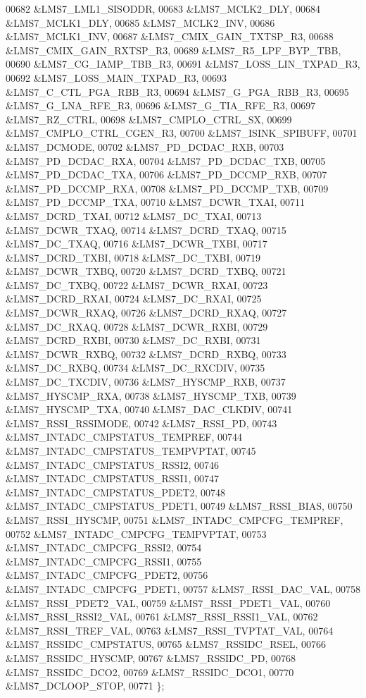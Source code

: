 \begin{DoxyCode}
00682 &LMS7_LML1_SISODDR,
00683 &LMS7_MCLK2_DLY,
00684 &LMS7_MCLK1_DLY,
00685 &LMS7_MCLK2_INV,
00686 &LMS7_MCLK1_INV,
00687 &LMS7_CMIX_GAIN_TXTSP_R3,
00688 &LMS7_CMIX_GAIN_RXTSP_R3,
00689 &LMS7_R5_LPF_BYP_TBB,
00690 &LMS7_CG_IAMP_TBB_R3,
00691 &LMS7_LOSS_LIN_TXPAD_R3,
00692 &LMS7_LOSS_MAIN_TXPAD_R3,
00693 &LMS7_C_CTL_PGA_RBB_R3,
00694 &LMS7_G_PGA_RBB_R3,
00695 &LMS7_G_LNA_RFE_R3,
00696 &LMS7_G_TIA_RFE_R3,
00697 &LMS7_RZ_CTRL,
00698 &LMS7_CMPLO_CTRL_SX,
00699 &LMS7_CMPLO_CTRL_CGEN_R3,
00700 &LMS7_ISINK_SPIBUFF,
00701 &LMS7_DCMODE,
00702 &LMS7_PD_DCDAC_RXB,
00703 &LMS7_PD_DCDAC_RXA,
00704 &LMS7_PD_DCDAC_TXB,
00705 &LMS7_PD_DCDAC_TXA,
00706 &LMS7_PD_DCCMP_RXB,
00707 &LMS7_PD_DCCMP_RXA,
00708 &LMS7_PD_DCCMP_TXB,
00709 &LMS7_PD_DCCMP_TXA,
00710 &LMS7_DCWR_TXAI,
00711 &LMS7_DCRD_TXAI,
00712 &LMS7_DC_TXAI,
00713 &LMS7_DCWR_TXAQ,
00714 &LMS7_DCRD_TXAQ,
00715 &LMS7_DC_TXAQ,
00716 &LMS7_DCWR_TXBI,
00717 &LMS7_DCRD_TXBI,
00718 &LMS7_DC_TXBI,
00719 &LMS7_DCWR_TXBQ,
00720 &LMS7_DCRD_TXBQ,
00721 &LMS7_DC_TXBQ,
00722 &LMS7_DCWR_RXAI,
00723 &LMS7_DCRD_RXAI,
00724 &LMS7_DC_RXAI,
00725 &LMS7_DCWR_RXAQ,
00726 &LMS7_DCRD_RXAQ,
00727 &LMS7_DC_RXAQ,
00728 &LMS7_DCWR_RXBI,
00729 &LMS7_DCRD_RXBI,
00730 &LMS7_DC_RXBI,
00731 &LMS7_DCWR_RXBQ,
00732 &LMS7_DCRD_RXBQ,
00733 &LMS7_DC_RXBQ,
00734 &LMS7_DC_RXCDIV,
00735 &LMS7_DC_TXCDIV,
00736 &LMS7_HYSCMP_RXB,
00737 &LMS7_HYSCMP_RXA,
00738 &LMS7_HYSCMP_TXB,
00739 &LMS7_HYSCMP_TXA,
00740 &LMS7_DAC_CLKDIV,
00741 &LMS7_RSSI_RSSIMODE,
00742 &LMS7_RSSI_PD,
00743 &LMS7_INTADC_CMPSTATUS_TEMPREF,
00744 &LMS7_INTADC_CMPSTATUS_TEMPVPTAT,
00745 &LMS7_INTADC_CMPSTATUS_RSSI2,
00746 &LMS7_INTADC_CMPSTATUS_RSSI1,
00747 &LMS7_INTADC_CMPSTATUS_PDET2,
00748 &LMS7_INTADC_CMPSTATUS_PDET1,
00749 &LMS7_RSSI_BIAS,
00750 &LMS7_RSSI_HYSCMP,
00751 &LMS7_INTADC_CMPCFG_TEMPREF,
00752 &LMS7_INTADC_CMPCFG_TEMPVPTAT,
00753 &LMS7_INTADC_CMPCFG_RSSI2,
00754 &LMS7_INTADC_CMPCFG_RSSI1,
00755 &LMS7_INTADC_CMPCFG_PDET2,
00756 &LMS7_INTADC_CMPCFG_PDET1,
00757 &LMS7_RSSI_DAC_VAL,
00758 &LMS7_RSSI_PDET2_VAL,
00759 &LMS7_RSSI_PDET1_VAL,
00760 &LMS7_RSSI_RSSI2_VAL,
00761 &LMS7_RSSI_RSSI1_VAL,
00762 &LMS7_RSSI_TREF_VAL,
00763 &LMS7_RSSI_TVPTAT_VAL,
00764 &LMS7_RSSIDC_CMPSTATUS,
00765 &LMS7_RSSIDC_RSEL,
00766 &LMS7_RSSIDC_HYSCMP,
00767 &LMS7_RSSIDC_PD,
00768 &LMS7_RSSIDC_DCO2,
00769 &LMS7_RSSIDC_DCO1,
00770 &LMS7_DCLOOP_STOP,
00771 \};
\end{DoxyCode}

